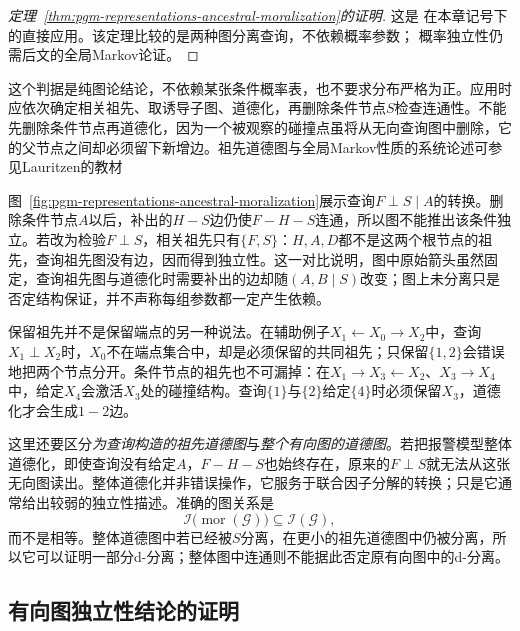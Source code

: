 \begin{proof}[定理~\ref{thm:pgm-representations-ancestral-moralization}的证明]
这是
在本章记号下的直接应用。该定理比较的是两种图分离查询，不依赖概率参数；
概率独立性仍需后文的全局Markov论证。
\end{proof}

这个判据是纯图论结论，不依赖某张条件概率表，也不要求分布严格为正。应用时应依次确定相关祖先、取诱导子图、道德化，再删除条件节点$S$检查连通性。不能先删除条件节点再道德化，因为一个被观察的碰撞点虽将从无向查询图中删除，它的父节点之间却必须留下新增边。祖先道德图与全局Markov性质的系统论述可参见Lauritzen的教材

图~\ref{fig:pgm-representations-ancestral-moralization}展示查询$F\perp S\mid A$的转换。删除条件节点$A$以后，补出的$H-S$边仍使$F-H-S$连通，所以图不能推出该条件独立。若改为检验$F\perp S$，相关祖先只有$\{F,S\}$：$H,A,D$都不是这两个根节点的祖先，查询祖先图没有边，因而得到独立性。这一对比说明，图中原始箭头虽然固定，查询祖先图与道德化时需要补出的边却随$(A,B\mid S)$改变；图上未分离只是否定结构保证，并不声称每组参数都一定产生依赖。

保留祖先并不是保留端点的另一种说法。在辅助例子$X_1\leftarrow X_0\to X_2$中，查询$X_1\perp X_2$时，$X_0$不在端点集合中，却是必须保留的共同祖先；只保留$\{1,2\}$会错误地把两个节点分开。条件节点的祖先也不可漏掉：在$X_1\to X_3\leftarrow X_2$、$X_3\to X_4$中，给定$X_4$会激活$X_3$处的碰撞结构。查询$\{1\}$与$\{2\}$给定$\{4\}$时必须保留$X_3$，道德化才会生成$1-2$边。

这里还要区分\emph{为查询构造的祖先道德图}与\emph{整个有向图的道德图}。若把报警模型整体道德化，即使查询没有给定$A$，$F-H-S$也始终存在，原来的$F\perp S$就无法从这张无向图读出。整体道德化并非错误操作，它服务于联合因子分解的转换；只是它通常给出较弱的独立性描述。准确的图关系是
\begin{equation}
  \mathcal{I}\bigl(\operatorname{mor}(\mathcal{G})\bigr)
  \subseteq \mathcal{I}(\mathcal{G}),
  \label{eq:pgm-representations-moral-inclusion}
\end{equation}
而不是相等。整体道德图中若已经被$S$分离，在更小的祖先道德图中仍被分离，所以它可以证明一部分d-分离；整体图中连通则不能据此否定原有向图中的d-分离。

\subsection{有向图独立性结论的证明}
\label{sec:pgm-representations-directed-proofs}

